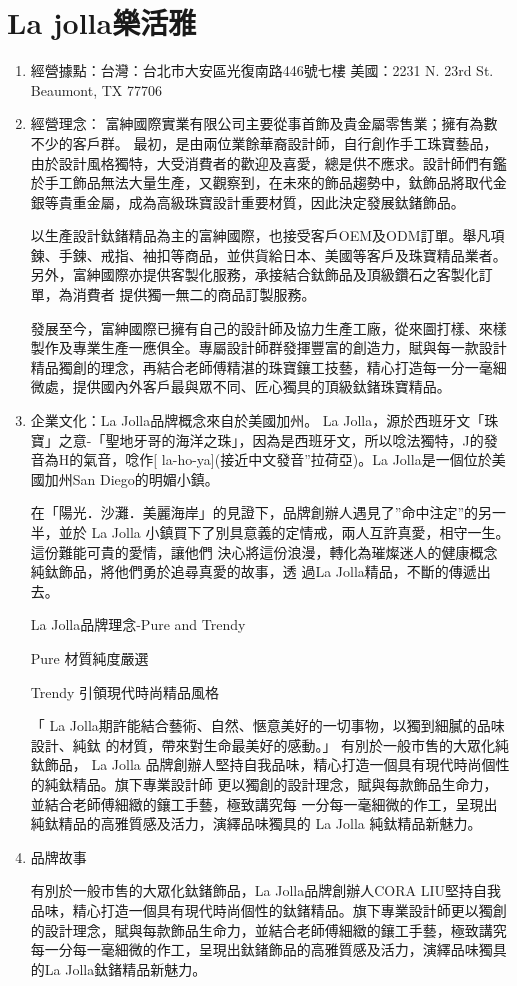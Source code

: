 \section{La jolla樂活雅}
\begin{enumerate}
 \item 經營據點：台灣：台北市大安區光復南路446號七樓 
               美國：2231 N. 23rd St. Beaumont, TX 77706

 \item  經營理念：
富紳國際實業有限公司主要從事首飾及貴金屬零售業；擁有為數不少的客戶群。
最初，是由兩位業餘華裔設計師，自行創作手工珠寶藝品，由於設計風格獨特，大受消費者的歡迎及喜愛，總是供不應求。設計師們有鑑於手工飾品無法大量生產，又觀察到，在未來的飾品趨勢中，鈦飾品將取代金銀等貴重金屬，成為高級珠寶設計重要材質，因此決定發展鈦鍺飾品。

以生產設計鈦鍺精品為主的富紳國際，也接受客戶OEM及ODM訂單。舉凡項鍊、手鍊、戒指、袖扣等商品，並供貨給日本、美國等客戶及珠寶精品業者。
另外，富紳國際亦提供客製化服務，承接結合鈦飾品及頂級鑽石之客製化訂單，為消費者
提供獨一無二的商品訂製服務。

發展至今，富紳國際已擁有自己的設計師及協力生產工廠，從來圖打樣、來樣製作及專業生產一應俱全。專屬設計師群發揮豐富的創造力，賦與每一款設計精品獨創的理念，再結合老師傅精湛的珠寶鑲工技藝，精心打造每一分一毫細微處，提供國內外客戶最與眾不同、匠心獨具的頂級鈦鍺珠寶精品。

 \item 企業文化：La Jolla品牌概念來自於美國加州。 La Jolla，源於西班牙文「珠寶」之意-「聖地牙哥的海洋之珠」，因為是西班牙文，所以唸法獨特，J的發音為H的氣音，唸作[ la-ho-ya](接近中文發音”拉荷亞)。La Jolla是一個位於美國加州San Diego的明媚小鎮。

在「陽光．沙灘．美麗海岸」的見證下，品牌創辦人遇見了”命中注定”的另一半，並於 La Jolla
小鎮買下了別具意義的定情戒，兩人互許真愛，相守一生。這份難能可貴的愛情，讓他們
決心將這份浪漫，轉化為璀燦迷人的健康概念純鈦飾品，將他們勇於追尋真愛的故事，透
過La Jolla精品，不斷的傳遞出去。

La Jolla品牌理念-Pure and  Trendy

Pure 材質純度嚴選 

Trendy 引領現代時尚精品風格 

「 La Jolla期許能結合藝術、自然、愜意美好的一切事物，以獨到細膩的品味設計、純鈦
的材質，帶來對生命最美好的感動。」 有別於一般市售的大眾化純鈦飾品， La Jolla
品牌創辦人堅持自我品味，精心打造一個具有現代時尚個性的純鈦精品。旗下專業設計師
更以獨創的設計理念，賦與每款飾品生命力，並結合老師傅細緻的鑲工手藝，極致講究每
一分每一毫細微的作工，呈現出純鈦精品的高雅質感及活力，演繹品味獨具的 La Jolla
純鈦精品新魅力。
 
\item 品牌故事

有別於一般市售的大眾化鈦鍺飾品，La Jolla品牌創辦人CORA LIU堅持自我品味，精心打造一個具有現代時尚個性的鈦鍺精品。旗下專業設計師更以獨創的設計理念，賦與每款飾品生命力，並結合老師傅細緻的鑲工手藝，極致講究每一分每一毫細微的作工，呈現出鈦鍺飾品的高雅質感及活力，演繹品味獨具的La Jolla鈦鍺精品新魅力。
\end{enumerate}

